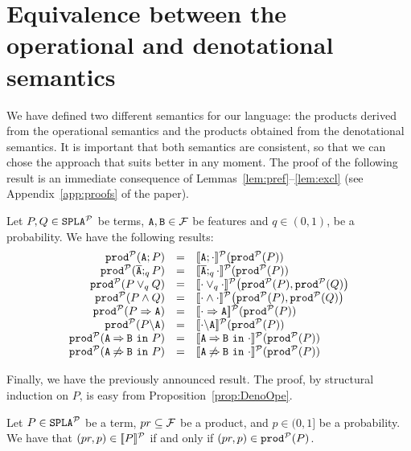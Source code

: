 \section{Equivalence between the operational and denotational semantics}\label{sec:equivalenceMain}
We have defined two different semantics for our language:
the products derived from the operational semantics and the products
obtained from the denotational semantics. It is important that
both semantics are consistent, so that we can chose the approach that suits
better in any moment. The proof of the following result is an immediate consequence of Lemmas~\ref{lem:pref}--\ref{lem:excl} (see Appendix~\ref{app:proofs} of the paper).

\bprop\label{prop:DenoOpe}
  Let $P,Q\in\mathtt{SPLA{^{\cal P}}}$ be terms, $\mathtt{A},\mathtt{B}\in{\cal F}$ be features and $q\in (0,1)$, be a probability. We have the following results:
  $$\begin{array}{rll}
  \prodp(\feature{A};P)&=&\semdenp{\feature{A};\cdot}(\prodp(P))\\
  \prodp(\ofeature{A};_qP)&=&\semdenp{\ofeature{A};_q\cdot}(\prodp(P))\\
  \prodp(P\choice_q Q)&=&\semdenp{\cdot\choice_q\cdot}\bigl(\prodp(P),\prodp(Q)\bigr)\\
  \prodp(P\paral Q)&=&\semdenp{\cdot\paral\cdot}\bigl(\prodp(P),\prodp(Q)\bigr)\\
  \prodp(\mandatory{A}{P})&=&\semdenp{\mandatory{A}{\cdot}}(\prodp(P))\\
  \prodp(\forbid{A}{P})&=&\semdenp{\forbid{A}{\cdot}}(\prodp(P))\\
  \prodp(\require{A}{B}{P})&=&\semdenp{\require{A}{B}{\cdot}}(\prodp(P))\\
  \prodp(\exclude{A}{B}{P})&=&\semdenp{\exclude{A}{B}{\cdot}}(\prodp(P))
\end{array}$$
\eprop

Finally, we have the previously announced result. The proof, by structural induction on $P$, is easy from
Proposition~\ref{prop:DenoOpe}.


\bthm\label{prop:equivprob}
  Let $P\in\mathtt{SPLA{^{\cal P}}}$ be a term, $pr\subseteq{\cal F}$ be a product, and
  $p\in(0,1]$ be a probability. We have that $ (pr,p)\in[\![P]\!]^{\cal P}$ if and only if
  $(pr,p)\in\mathtt{prod}^{\cal P}(P)$.
\ethm



